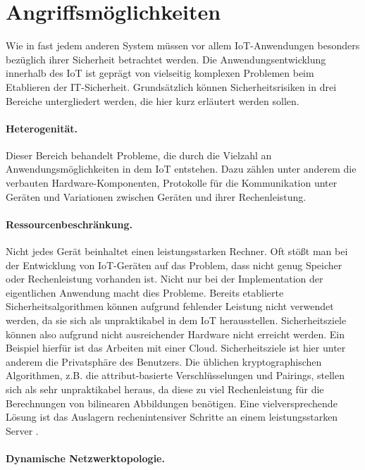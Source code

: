 \section{Angriffsmöglichkeiten}
Wie in fast jedem anderen System müssen vor allem IoT-Anwendungen besonders
bezüglich ihrer Sicherheit betrachtet werden. Die Anwendungsentwicklung
innerhalb des IoT ist geprägt von vielseitig komplexen Problemen beim Etablieren
der IT-Sicherheit. Grundsätzlich können Sicherheitsrisiken in drei Bereiche
untergliedert werden, die hier kurz erläutert werden sollen.

\paragraph{Heterogenität.}
Dieser Bereich behandelt Probleme, die durch die Vielzahl an
Anwendungsmöglichkeiten in dem IoT entstehen. Dazu zählen unter anderem
die verbauten Hardware-Komponenten, Protokolle für die Kommunikation unter
Geräten und Variationen zwischen Geräten und ihrer Rechenleistung.

\paragraph{Ressourcenbeschränkung.}
Nicht jedes Gerät beinhaltet einen leistungsstarken Rechner. Oft stößt man bei
der Entwicklung von IoT-Geräten auf das Problem, dass nicht genug Speicher oder
Rechenleistung vorhanden ist. Nicht nur bei der Implementation der eigentlichen
Anwendung macht dies Probleme. Bereits etablierte Sicherheitsalgorithmen können
aufgrund fehlender Leistung nicht verwendet werden, da sie sich als
unpraktikabel in dem IoT herausstellen. Sicherheitsziele können also aufgrund
nicht ausreichender Hardware nicht erreicht werden. Ein Beispiel hierfür ist das
Arbeiten mit einer Cloud. Sicherheitsziele ist hier unter anderem die
Privatsphäre des Benutzers. Die üblichen kryptographischen Algorithmen, z.B. die
attribut-basierte Verschlüsselungen und Pairings, stellen sich als sehr
unpraktikabel heraus, da diese zu viel Rechenleistung für die Berechnungen von
bilinearen Abbildungen benötigen. Eine vielversprechende Lösung ist das
Auslagern rechenintensiver Schritte an einem leistungsstarken Server
\cite{phoabe}.

\paragraph{Dynamische Netzwerktopologie.}
